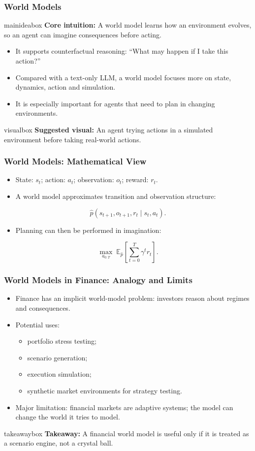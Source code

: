 \documentclass[aspectratio=169,12pt]{beamer}
\newcommand{\currentframetitle}{}
\newcommand{\slideTitle}[1]{\gdef\currentframetitle{#1}\frametitle{#1}}
\newcommand{\mainidea}[1]{%
  \vspace{0.08cm}
  \begin{beamercolorbox}[wd=\linewidth,rounded=true,sep=0.18cm]{mainideabox}
    \small\textbf{Core intuition:} #1
  \end{beamercolorbox}%
}
\newcommand{\takeaway}[1]{%
  \vspace{0.08cm}
  \begin{beamercolorbox}[wd=\linewidth,rounded=true,sep=0.18cm]{takeawaybox}
    \small\textbf{Takeaway:} #1
  \end{beamercolorbox}%
}
\newcommand{\visual}[1]{%
  \vspace{0.12cm}
  \begin{beamercolorbox}[wd=\linewidth,rounded=true,sep=0.16cm]{visualbox}
    \scriptsize\textbf{Suggested visual:} #1
  \end{beamercolorbox}%
}
\begin{document}
\begin{frame}
\slideTitle{World Models}
\mainidea{A world model learns how an environment evolves, so an agent can imagine consequences before acting.}
\begin{itemize}
  \item It supports counterfactual reasoning: ``What may happen if I take this action?''
  \item Compared with a text-only LLM, a world model focuses more on state, dynamics, action and simulation.
  \item It is especially important for agents that need to plan in changing environments.
\end{itemize}
\visual{An agent trying actions in a simulated environment before taking real-world actions.}
\end{frame}



\begin{frame}
\slideTitle{World Models: Mathematical View}
\begin{itemize}
  \item State: $s_t$; action: $a_t$; observation: $o_t$; reward: $r_t$.
  \item A world model approximates transition and observation structure:
\end{itemize}
\[
    \hat{p}(s_{t+1}, o_{t+1}, r_t \mid s_t, a_t).
\]
\begin{itemize}
  \item Planning can then be performed in imagination:
\end{itemize}
\[
    \max_{a_{0:T}} \; \mathbb{E}_{\hat{p}}\left[\sum_{t=0}^T \gamma^t r_t\right].
\]
\end{frame}

\begin{frame}
\slideTitle{World Models in Finance: Analogy and Limits}
\begin{itemize}
  \item Finance has an implicit world-model problem: investors reason about regimes and consequences.
  \item Potential uses:
  \begin{itemize}
    \item portfolio stress testing;
    \item scenario generation;
    \item execution simulation;
    \item synthetic market environments for strategy testing.
  \end{itemize}
  \item Major limitation: financial markets are adaptive systems; the model can change the world it tries to model.
\end{itemize}
\takeaway{A financial world model is useful only if it is treated as a scenario engine, not a crystal ball.}
\end{frame}
\end{document}
